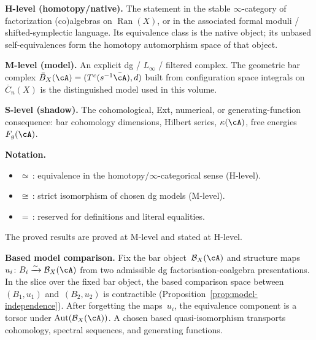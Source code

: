 \begin{convention}
\label{conv:hms-levels}

\smallskip\noindent\textbf{H-level (homotopy/native).}
The statement in the stable $\infty$-category of factorization
(co)algebras on $\operatorname{Ran}(X)$, or in the associated
formal moduli / shifted-symplectic language.  Its equivalence class is
the native object; its unbased self-equivalences form the homotopy
automorphism space of that object.

\smallskip\noindent\textbf{M-level (model).}
An explicit dg / $L_\infty$ / filtered complex. The geometric
bar complex $\bar{B}_X(\cA) = (T^c(s^{-1}\bar{\cA}), d)$ built
from configuration space integrals on $\overline{C}_n(X)$ is the
distinguished model used in this volume.

\smallskip\noindent\textbf{S-level (shadow).}
The cohomological, Ext, numerical, or generating-function
consequence: bar cohomology dimensions, Hilbert series,
$\kappa(\cA)$, free energies $F_g(\cA)$.

\smallskip\noindent\textbf{Notation.}
\begin{itemize}
\item $\simeq$\,: equivalence in the homotopy/$\infty$-categorical
 sense (H-level).
\item $\cong$\,: strict isomorphism of chosen dg models (M-level).
\item $=$\,: reserved for definitions and literal equalities.
\end{itemize}
The proved results are proved at
M-level and stated at H-level.

\smallskip\noindent\textbf{Based model comparison.}
Fix the bar object~$\mathcal B_X(\cA)$ and structure maps
$u_i\colon B_i\xrightarrow{\sim}\mathcal B_X(\cA)$ from two admissible
dg factorisation-coalgebra presentations.  In the slice over the fixed bar
object, the based comparison space between
$(B_1,u_1)$ and~$(B_2,u_2)$ is contractible
(Proposition~\ref{prop:model-independence}).  After forgetting the
maps~$u_i$, the equivalence component is a torsor under
$\operatorname{Aut}(\mathcal B_X(\cA))$.  A chosen based
quasi-isomorphism transports cohomology, spectral sequences, and
generating functions.
\end{convention}

